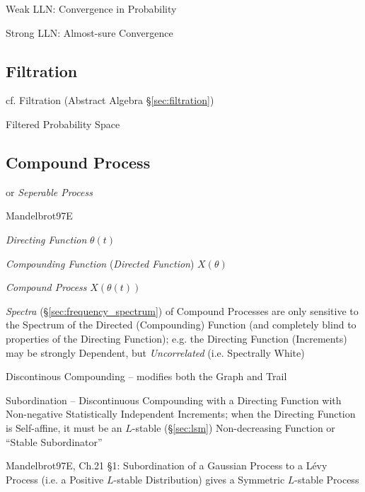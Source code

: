 Weak LLN: Convergence in Probability

Strong LLN: Almost-sure Convergence



\subsection{Filtration}\label{sec:stochastic_filtration}

cf. Filtration (Abstract Algebra \S\ref{sec:filtration})

Filtered Probability Space



\subsection{Compound Process}\label{sec:compound_process}

or \emph{Seperable Process}

Mandelbrot97E

\emph{Directing Function} $\theta(t)$

\emph{Compounding Function} (\emph{Directed Function}) $X(\theta)$

\emph{Compound Process} $X(\theta(t))$


\emph{Spectra} (\S\ref{sec:frequency_spectrum}) of Compound Processes are only
sensitive to the Spectrum of the Directed (Compounding) Function (and completely
blind to properties of the Directing Function); e.g. the Directing Function
(Increments) may be strongly Dependent, but \emph{Uncorrelated} (i.e. Spectrally
White)

Discontinous Compounding -- modifies both the Graph and Trail

Subordination -- Discontinuous Compounding with a Directing Function with
Non-negative Statistically Independent Increments;
when the Directing Function is Self-affine, it must be an $L$-stable
(\S\ref{sec:lsm}) Non-decreasing Function or ``Stable Subordinator''

Mandelbrot97E, Ch.21 \S 1: Subordination of a Gaussian Process to a L\'evy
Process (i.e. a Positive $L$-stable Distribution) gives a Symmetric $L$-stable
Process

